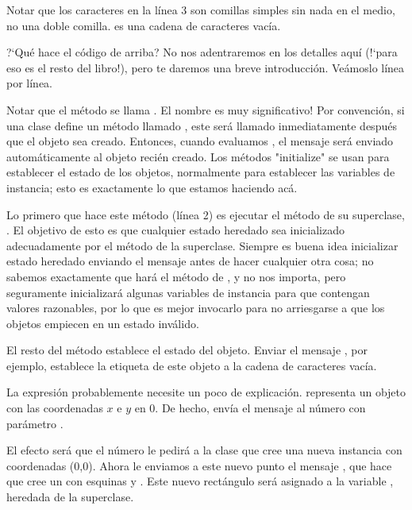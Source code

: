 \documentclass[a4paper,10pt,twoside]{book}
\begin{document}
\noindent
Notar que los caracteres  en la l\'inea 3 son comillas simples sin nada en el medio, no una doble comilla.  es una cadena de caracteres vac\'ia. 


?`Qu\'e hace el c\'odigo de arriba? No nos adentraremos en los detalles aqu\'i (!`para eso es el resto del libro!), pero te daremos una breve introducci\'on. Ve\'amoslo l\'inea por l\'inea.

Notar que el m\'etodo se llama .
El nombre es muy significativo!
Por convenci\'on, si una clase define un m\'etodo llamado , este ser\'a llamado inmediatamente despu\'es que el objeto sea creado. 
Entonces, cuando evaluamos , el mensaje  ser\'a enviado autom\'aticamente al objeto reci\'en creado. 
Los m\'etodos "initialize" se usan para establecer el estado de los objetos, normalmente para establecer las variables de instancia; esto es exactamente lo que estamos haciendo ac\'a. 

Lo primero que hace este m\'etodo (l\'inea 2) es ejecutar el m\'etodo  de su superclase, .
El objetivo de esto es que cualquier estado heredado sea inicializado adecuadamente por el m\'etodo  de la superclase.
Siempre es buena idea inicializar estado heredado enviando el mensaje  antes de hacer cualquier otra cosa; no sabemos exactamente que har\'a el m\'etodo  de , y no nos importa, pero seguramente inicializar\'a algunas variables de instancia para que contengan valores razonables, por lo que es mejor invocarlo para no arriesgarse a que los objetos empiecen en un estado inv\'alido.

El resto del m\'etodo establece el estado del objeto.
Enviar el mensaje , por ejemplo, establece la etiqueta de este objeto a la cadena de caracteres vac\'ia.

La expresi\'on  probablemente necesite un poco de explicaci\'on.
 representa un objeto  con las coordenadas $x$ e $y$ en 0.
De hecho,  env\'ia el mensaje  al n\'umero  con par\'ametro .

El efecto ser\'a que el n\'umero  le pedir\'a a la clase  que cree una nueva instancia con coordenadas (0,0).
Ahora le enviamos a este nuevo punto el mensaje , que hace que cree un  con esquinas  y .
Este nuevo rect\'angulo ser\'a asignado a la variable , heredada de la superclase. 
\end{document}
